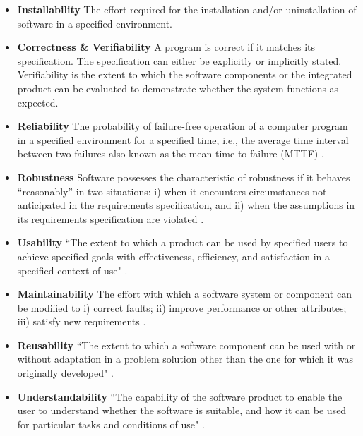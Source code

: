 \documentclass[final, 3p, times, authoryear]{elsarticle}
\begin{document}
\begin{itemize}
	\item \textbf{Installability} The effort required for the installation
    and/or uninstallation of software in a specified environment.

	\item \textbf{Correctness \& Verifiability} A program is correct if it
    matches its specification.  The specification can either be explicitly or
    implicitly stated.  Verifiability is the extent to which the software
    components or the integrated product can be evaluated to demonstrate whether
    the system functions as expected.

	\item \textbf{Reliability} The probability of failure-free operation of a
	computer program in a specified environment for a specified time, i.e., the
	average time interval between two failures also known as the mean time to
	failure (MTTF) \citep{musa1987software} \citep{GhezziEtAl2003}.

	\item \textbf{Robustness} Software possesses the characteristic of
	robustness if it behaves ``reasonably'' in two situations: i) when it
	encounters circumstances not anticipated in the requirements specification,
	and ii) when the assumptions in its requirements specification are violated
	\citep{ghezzi1991fundamentals} \citep{boehm2007software}.

	\item \textbf{Usability} ``The extent to which a product can be used by
	specified users to achieve specified goals with effectiveness, efficiency,
	and satisfaction in a specified context of use" \citep{ISO/TR16982:2002}
	\citep{ISO9241-11:2018}.

	\item \textbf{Maintainability} The effort with which a software system or
	component can be modified to i) correct faults; ii) improve performance or
	other attributes; iii) satisfy new requirements
	\citep{IEEEStdGlossarySET1990} \citep{boehm2007software}.

	\item \textbf{Reusability} ``The extent to which a software component can be
	used with or without adaptation in a problem solution other than the one for
	which it was originally developed" \citep{kalagiakos2003non}.

	\item \textbf{Understandability} ``The capability of the software product to
	enable the user to understand whether the software is suitable, and how it
	can be used for particular tasks and conditions of use" \citep{iso2001iec}.


\end{itemize}
\end{document}
